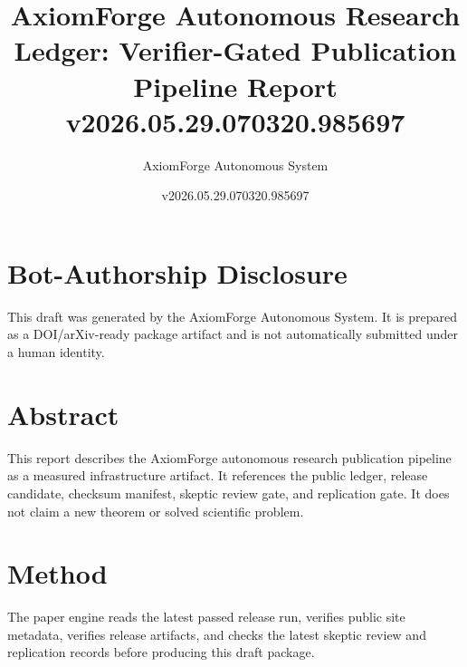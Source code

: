 \documentclass[11pt]{article}
\title{AxiomForge Autonomous Research Ledger: Verifier-Gated Publication Pipeline Report v2026.05.29.070320.985697}
\author{AxiomForge Autonomous System}
\date{v2026.05.29.070320.985697}
\begin{document}
\maketitle

\section*{Bot-Authorship Disclosure}
This draft was generated by the AxiomForge Autonomous System. It is prepared as
a DOI/arXiv-ready package artifact and is not automatically submitted under a
human identity.

\section*{Abstract}
This report describes the AxiomForge autonomous research publication pipeline
as a measured infrastructure artifact. It references the public ledger,
release candidate, checksum manifest, skeptic review gate, and replication gate.
It does not claim a new theorem or solved scientific problem.

\section*{Method}
The paper engine reads the latest passed release run, verifies public site
metadata, verifies release artifacts, and checks the latest skeptic review and
replication records before producing this draft package.
\end{document}
